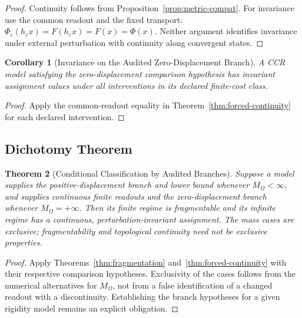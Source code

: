 \documentclass[11pt,a4paper]{article}
\theoremstyle{plain}
\newtheorem{theorem}{Theorem}[section]
\newtheorem{corollary}[theorem]{Corollary}
\theoremstyle{definition}
\theoremstyle{remark}
\begin{document}
\begin{proof}
Continuity follows from Proposition~\ref{prop:metric-compat}. For invariance use the common readout and the fixed transport: $\Phi_\varepsilon(h_\varepsilon x)=F(h_\varepsilon x)=F(x)=\Phi(x)$. Neither argument identifies invariance under external perturbation with continuity along convergent states.
\end{proof}

\begin{corollary}[Invariance on the Audited Zero-Displacement Branch]
A CCR model satisfying the zero-displacement comparison hypothesis has invariant assignment values under all interventions in its declared finite-cost class.
\end{corollary}

\begin{proof}
Apply the common-readout equality in Theorem~\ref{thm:forced-continuity} for each declared intervention.
\end{proof}

\subsection{Dichotomy Theorem}

\begin{theorem}[Conditional Classification by Audited Branches]\label{thm:dichotomy}
Suppose a model supplies the positive-displacement branch and lower bound whenever $M_\Omega<\infty$, and supplies continuous finite readouts and the zero-displacement branch whenever $M_\Omega=+\infty$. Then its finite regime is fragmentable and its infinite regime has a continuous, perturbation-invariant assignment. The mass cases are exclusive; fragmentability and topological continuity need not be exclusive properties.
\end{theorem}

\begin{proof}
Apply Theorems~\ref{thm:fragmentation} and~\ref{thm:forced-continuity} with their respective comparison hypotheses. Exclusivity of the cases follows from the numerical alternatives for $M_\Omega$, not from a false identification of a changed readout with a discontinuity. Establishing the branch hypotheses for a given rigidity model remains an explicit obligation.
\end{proof}

\end{document}

